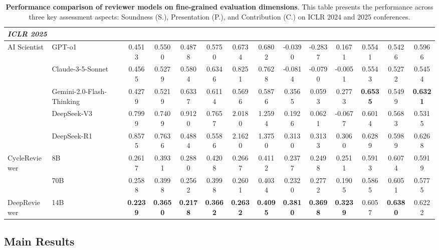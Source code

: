 \documentclass{article}
\begin{document}
\begin{table}[h]
{\begin{tabular}{@{}ll|cccccc|ccc|ccc@{}}
\toprule
\multicolumn{14}{l}{\textit{\textbf{ICLR 2025}}} \\

\toprule
\multirow{5}{*}{AI Scientist} & GPT-o1 & 0.4513 & 0.5500 & 0.4878 & 0.5750 & 0.6734 & 0.6802 & -0.0390 & -0.2837 & 0.1671 & 0.5541 & 0.5426 & 0.5966 \\
 & Claude-3-5-Sonnet & 0.4565 & 0.5279 & 0.5804 & 0.6346 & 0.8251 & 0.7628 & -0.0814 & -0.0790 & -0.0051 & 0.5543 & 0.5272 & 0.5454 \\
 & Gemini-2.0-Flash-Thinking & 0.4279 & 0.5219 & 0.6337 & 0.6114 & 0.5696 & 0.5876 & 0.3565 & 0.0593 & 0.2773 & \cellcolor[HTML]{F9EBE3}\textbf{0.6535} & 0.5499 & \cellcolor[HTML]{F9EBE3}\textbf{0.6321} \\
 & DeepSeek-V3 & 0.7999 & 0.7409 & 0.9120 & 0.7657 & 2.0180 & 1.2594 & 0.1926 & 0.0621 & -0.0677 & 0.6014 & 0.5683 & 0.5315 \\
 & DeepSeek-R1 & 0.8575 & 0.7636 & 0.4884 & 0.5586 & 2.1620 & 1.3750 & 0.3130 & 0.3133 & 0.3060 & 0.6289 & 0.5989 & 0.6268 \\
\midrule
\multirow{2}{*}{CycleReviewer} & 8B & 0.2617 & 0.3931 & 0.2880 & 0.4208 & 0.2667 & 0.4112 & 0.2377 & 0.2498 & 0.2511 & 0.5913 & 0.6074 & 0.5919 \\
 & 70B & 0.2588 & 0.3998 & 0.2562 & 0.3998 & 0.2601 & 0.4034 & 0.2320 & 0.2772 & 0.1905 & 0.5865 & 0.6051 & 0.5775 \\
\midrule
DeepReviewer & 14B & \cellcolor[HTML]{F9EBE3}\textbf{0.2239} & \cellcolor[HTML]{F9EBE3}\textbf{0.3650} & \cellcolor[HTML]{F9EBE3}\textbf{0.2178} & \cellcolor[HTML]{F9EBE3}\textbf{0.3662} & \cellcolor[HTML]{F9EBE3}\textbf{0.2632} & \cellcolor[HTML]{F9EBE3}\textbf{0.4095} & \cellcolor[HTML]{F9EBE3}\textbf{0.3810} & \cellcolor[HTML]{F9EBE3}\textbf{0.3698} & \cellcolor[HTML]{F9EBE3}\textbf{0.3239} & 0.6057 & \cellcolor[HTML]{F9EBE3}\textbf{0.6380} & 0.6222 \\

\toprule
\end{tabular}}
\caption{\textbf{Performance comparison of reviewer models on fine-grained evaluation dimensions}. This table presents the performance across three key assessment aspects: Soundness (S.), Presentation (P.), and Contribution (C.) on ICLR 2024 and 2025 conferences.}
\label{tab:detailed_results_combined}
\end{table}
\subsection{Main Results}
\end{document}
